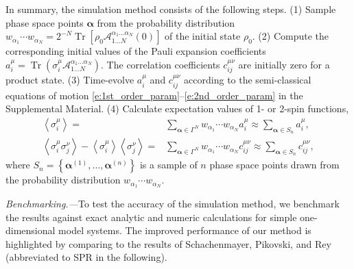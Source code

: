 \documentclass[aps,prl,showpacs,amsmath,amssymb,superscriptaddress,reprint,10pt]{revtex4-1}
\newcommand{\mvec}[1]{\boldsymbol #1}
\DeclareMathOperator{\Tr}{{Tr}}
\begin{document}
In summary, the simulation method consists of the following steps. (1) Sample phase space points $\mvec{\alpha}$ from the probability distribution $w_{\alpha_1}\cdots w_{\alpha_N}=2^{-N}\Tr\left[\rho_0 \mathscr{A}_{1\dotsc N}^{\alpha_1\dotsc\alpha_N}(0)\right]$ of the initial state $\rho_0$. (2) Compute the corresponding initial values of the Pauli expansion coefficients $a_i^\mu=\Tr\left(\sigma_i^\mu \mathscr{A}_{1\dotsc N}^{\alpha_1\dotsc\alpha_N}\right)$. The correlation coefficients $c_{ij}^{\mu\nu}$ are initially zero for a product state. (3) Time-evolve $a_i^\mu$ and $c_{ij}^{\mu\nu}$ according to the semi-classical equations of motion \eqref{e:1st_order_param}--\eqref{e:2nd_order_param} in the Supplemental Material. (4) Calculate expectation values of 1- or 2-spin functions,
\begin{subequations}
\begin{align}
\left\langle\sigma_i^\mu\right\rangle =& \sum_{\mvec{\alpha}\in\Gamma^N}w_{\alpha_1}\cdots w_{\alpha_N} a_i^\mu \approx \sum_{\mvec{\alpha}\in S_n}a_i^\mu,\label{e:1spin}\\
\left\langle\sigma_i^\mu\sigma_j^\nu\right\rangle - \left\langle\sigma_i^\mu\right\rangle\left\langle\sigma_j^\nu\right\rangle =& \sum_{\mvec{\alpha}\in\Gamma^N}w_{\alpha_1}\cdots w_{\alpha_N} c_{ij}^{\mu\nu} \approx \sum_{\mvec{\alpha}\in S_n}c_{ij}^{\mu\nu},\label{e:2spin}
\end{align}
\end{subequations}
where $S_n=\left\{\mvec{\alpha}^{(1)},\dots,\mvec{\alpha}^{(n)}\right\}$ is a sample of $n$ phase space points drawn from the probability distribution $w_{\alpha_1}\cdots w_{\alpha_N}$.


{\em Benchmarking.---}To test the accuracy of the simulation method, we benchmark the results against exact analytic and numeric calculations for simple one-dimensional model systems. The improved performance of our method is highlighted by comparing to the results of Schachenmayer, Pikovski, and Rey \cite{Schachenmayer_etal15} (abbreviated to SPR in the following).
\end{document}
